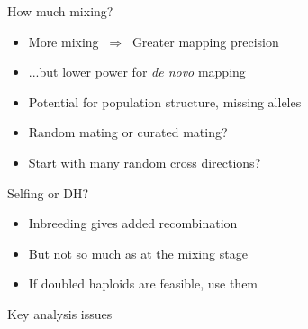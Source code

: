 \documentclass[12pt]{article}
\newcommand{\headsize}{\fontsize{35}{35} \selectfont}
\newcommand{\smallsize}{\fontsize{25}{30} \selectfont}
\begin{document}
{\newpage


\headsize \color{myyellow}
\hfill \begin{minipage}{5.75in}
\centering
How much mixing?
\end{minipage}

\vspace{25mm}

\color{mywhite}
\smallsize

\hfill \begin{minipage}{10in}
\begin{itemize}
\itemsep24pt
\item More mixing $ \ \Rightarrow \ $ Greater mapping precision
\item ...but lower power for \emph{de novo\/} mapping
\item Potential for population structure, missing alleles
\color{myblue}
\item Random mating or curated mating?
\item Start with many random cross directions?
\end{itemize}
\end{minipage}


\newpage


\headsize \color{myyellow}
\hfill \begin{minipage}{5.75in}
\centering
Selfing or DH?
\end{minipage}

\vspace{25mm}

\color{mywhite}
\smallsize

\hfill \begin{minipage}{10in}
\begin{itemize}
\itemsep24pt
\item Inbreeding gives added recombination
\item But not so much as at the mixing stage
\color{myblue}
\item If doubled haploids are feasible, use them
\end{itemize}
\end{minipage}



\newpage


\headsize \color{myyellow}
\hfill \begin{minipage}{5.75in}
\centering
Key analysis issues
\end{minipage}

}
\end{document}
